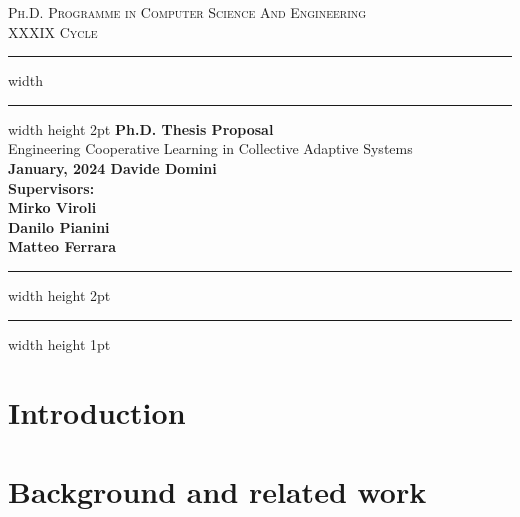 \documentclass[12pt]{article}
\begin{document}
\begin{titlepage}

	\newcommand{\HRule}{\rule{\linewidth}{0.5mm}}
	\center
	
	\textsc{\Large Ph.D. Programme in Computer Science And Engineering}\\[0.5cm]
	
	\textsc{\Large XXXIX Cycle}\\[0.6cm]
	
	\hrule width \hsize \kern 1mm \hrule width \hsize height 2pt 
	\vspace{0.8cm}
	{ \large \bfseries Ph.D. Thesis Proposal}\\[0.6cm]
	{ \large Engineering Cooperative Learning in Collective Adaptive Systems}\\[0.6cm]
	
	
	
	{\bfseries{January, 2024}
	\hfill
	\bfseries{Davide Domini}}\\[0.6cm]
	
	{\bfseries{Supervisors}: \\ [0.1cm]
	Mirko Viroli \\
	Danilo Pianini \\
	Matteo Ferrara
	} \\[0.6cm]

	\hrule width \hsize height 2pt \kern 1mm \hrule width \hsize height 1pt
	\vspace{0.4cm}
	
\end{titlepage}

\section{Introduction}\label{sec:intro}

\section{Background and related work}\label{sec:related}
\end{document}
